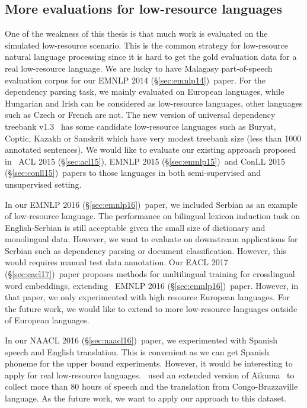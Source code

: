 \documentclass[12pt,twoside,final,hidelinks]{ltthesis}
\theoremstyle{definition}
\newcommand\emnlpiv{EMNLP 2014 (\S\ref{sec:emnlp14})}
\newcommand\conllv{ConLL 2015 (\S\ref{sec:conll15})}
\newcommand\aclv{ACL 2015 (\S\ref{sec:acl15})}
\newcommand\emnlpv{EMNLP 2015 (\S\ref{sec:emnlp15})}
\newcommand\naaclvi{NAACL 2016 (\S\ref{sec:naacl16})}
\newcommand\emnlpvi{EMNLP 2016 (\S\ref{sec:emnlp16})}
\newcommand\eaclvii{EACL 2017 (\S\ref{sec:eacl17})}
\begin{document}
\subsection{More evaluations for low-resource languages} 
One of the weakness of this thesis is that much work is evaluated on the simulated low-resource scenario.
This is the common strategy for low-resource natural language processing since it is hard to get the gold evaluation data 
for a real low-resource language. We are lucky to have Malagasy part-of-speech evaluation corpus for our \emnlpiv\ paper. 
For the dependency parsing task, we mainly evaluated on European languages, while Hungarian and Irish can be considered as  
low-resource languages, other languages such as Czech or French are not. 
The new version of universal dependency 
treebank v1.3~\cite{11234/1-1699} has some candidate low-resource languages such as Buryat, Coptic, Kazakh or Sanskrit
which have very modest treebank size (less than 1000 annotated sentences). We would like to evaluate our existing approach 
proposed in ~\aclv, \emnlpv\ and \conllv\ papers to those languages in both semi-supervised and unsupervised setting. 

In our \emnlpvi\ paper, we included Serbian as an example of low-resource language. The performance on bilingual lexicon induction 
task on English-Serbian is still acceptable given the small size of dictionary and monolingual data. However, we want to evaluate  
on downstream applications for Serbian such as dependency parsing or document classification. However, this would requires manual 
test data annotation. Our \eaclvii\ paper proposes methods for multilingual training for crosslingual word embeddings, extending 
~\emnlpvi\ paper. However, in that paper, we only experimented with high resource European languages. For the future work, we would 
like to extend to more low-resource languages outside of European languages. 

In our \naaclvi\ paper, we experimented with Spanish speech and English translation. This is convenient as we can get Spanish phoneme 
for the upper bound experiments. However, it would be interesting to apply for real low-resource languages.~ used 
an extended version of Aikuma~\cite{bird-EtAl:2014:W14-22} to collect more than 80 hours of speech and the translation from Congo-Brazzaville
language. As the future work, we want to apply our approach to this dataset. 
\end{document}
